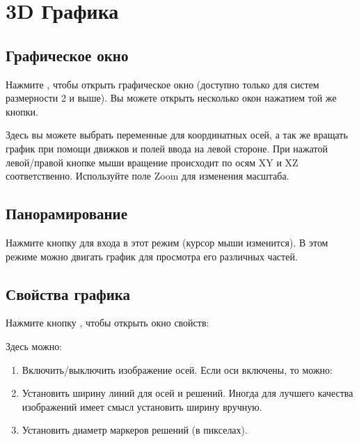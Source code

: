 \documentclass[12pt]{article}
\begin{document}


\section{3D Графика}

\subsection{Графическое окно}

Нажмите , чтобы открыть графическое окно (доступно только для систем размерности 2 и выше).
Вы можете открыть несколько окон нажатием той же кнопки.



Здесь вы можете выбрать переменные для координатных осей,
а так же вращать график при помощи движков и полей ввода на левой стороне. 
При нажатой левой/правой кнопке мыши вращение происходит по осям XY и XZ соответственно.
Используйте поле Zoom для изменения масштаба.


\subsection{Панорамирование}

Нажмите кнопку   
для входа в этот режим (курсор мыши изменится).
В этом режиме можно двигать график для просмотра его различных частей. 

\subsection{Свойства графика}

Нажмите кнопку , чтобы открыть окно свойств:


Здесь можно:
\begin{enumerate}
\item Включить/выключить изображение осей. Если оси включены, то можно:
\item Установить ширину линий для осей и решений. 
Иногда для лучшего качества изображений имеет смысл установить ширину вручную.
\item Установить диаметр маркеров решений (в пикселах).
\end{enumerate}
\end{document}
